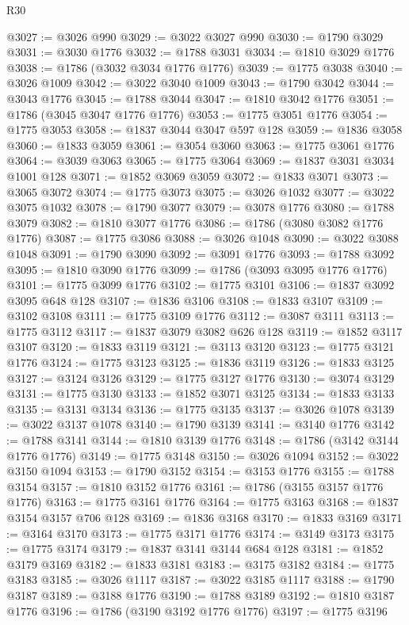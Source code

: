 \begin{lexlean}{R30}
\begin{coremodule}
@3027 := @3026 @990
@3029 := @3022 @3027 @990
@3030 := @1790 @3029
@3031 := @3030 @1776
@3032 := @1788 @3031
@3034 := @1810 @3029 @1776
@3038 := @1786 (@3032 @3034 @1776 @1776)
@3039 := @1775 @3038
@3040 := @3026 @1009
@3042 := @3022 @3040 @1009
@3043 := @1790 @3042
@3044 := @3043 @1776
@3045 := @1788 @3044
@3047 := @1810 @3042 @1776
@3051 := @1786 (@3045 @3047 @1776 @1776)
@3053 := @1775 @3051 @1776
@3054 := @1775 @3053
@3058 := @1837 @3044 @3047 @597 @128
@3059 := @1836 @3058
@3060 := @1833 @3059
@3061 := @3054 @3060
@3063 := @1775 @3061 @1776
@3064 := @3039 @3063
@3065 := @1775 @3064
@3069 := @1837 @3031 @3034 @1001 @128
@3071 := @1852 @3069 @3059
@3072 := @1833 @3071
@3073 := @3065 @3072
@3074 := @1775 @3073
@3075 := @3026 @1032
@3077 := @3022 @3075 @1032
@3078 := @1790 @3077
@3079 := @3078 @1776
@3080 := @1788 @3079
@3082 := @1810 @3077 @1776
@3086 := @1786 (@3080 @3082 @1776 @1776)
@3087 := @1775 @3086
@3088 := @3026 @1048
@3090 := @3022 @3088 @1048
@3091 := @1790 @3090
@3092 := @3091 @1776
@3093 := @1788 @3092
@3095 := @1810 @3090 @1776
@3099 := @1786 (@3093 @3095 @1776 @1776)
@3101 := @1775 @3099 @1776
@3102 := @1775 @3101
@3106 := @1837 @3092 @3095 @648 @128
@3107 := @1836 @3106
@3108 := @1833 @3107
@3109 := @3102 @3108
@3111 := @1775 @3109 @1776
@3112 := @3087 @3111
@3113 := @1775 @3112
@3117 := @1837 @3079 @3082 @626 @128
@3119 := @1852 @3117 @3107
@3120 := @1833 @3119
@3121 := @3113 @3120
@3123 := @1775 @3121 @1776
@3124 := @1775 @3123
@3125 := @1836 @3119
@3126 := @1833 @3125
@3127 := @3124 @3126
@3129 := @1775 @3127 @1776
@3130 := @3074 @3129
@3131 := @1775 @3130
@3133 := @1852 @3071 @3125
@3134 := @1833 @3133
@3135 := @3131 @3134
@3136 := @1775 @3135
@3137 := @3026 @1078
@3139 := @3022 @3137 @1078
@3140 := @1790 @3139
@3141 := @3140 @1776
@3142 := @1788 @3141
@3144 := @1810 @3139 @1776
@3148 := @1786 (@3142 @3144 @1776 @1776)
@3149 := @1775 @3148
@3150 := @3026 @1094
@3152 := @3022 @3150 @1094
@3153 := @1790 @3152
@3154 := @3153 @1776
@3155 := @1788 @3154
@3157 := @1810 @3152 @1776
@3161 := @1786 (@3155 @3157 @1776 @1776)
@3163 := @1775 @3161 @1776
@3164 := @1775 @3163
@3168 := @1837 @3154 @3157 @706 @128
@3169 := @1836 @3168
@3170 := @1833 @3169
@3171 := @3164 @3170
@3173 := @1775 @3171 @1776
@3174 := @3149 @3173
@3175 := @1775 @3174
@3179 := @1837 @3141 @3144 @684 @128
@3181 := @1852 @3179 @3169
@3182 := @1833 @3181
@3183 := @3175 @3182
@3184 := @1775 @3183
@3185 := @3026 @1117
@3187 := @3022 @3185 @1117
@3188 := @1790 @3187
@3189 := @3188 @1776
@3190 := @1788 @3189
@3192 := @1810 @3187 @1776
@3196 := @1786 (@3190 @3192 @1776 @1776)
@3197 := @1775 @3196

\end{coremodule}
\end{lexlean}
